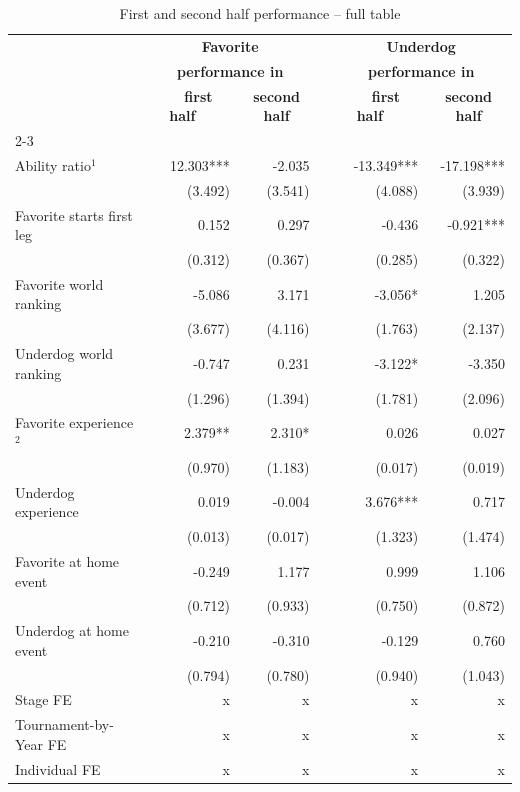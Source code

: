 \documentclass[11pt,a4paper]{article}
\begin{document}
	\begin{table}[H]
		\centering
		\caption{First and second half performance -- full table} 
		\label{tab:table_app_half}
		\begin{tabular}{l r r r r r} 
			\toprule \toprule
			& \multicolumn{2}{c}{\textbf{Favorite}} & &  \multicolumn{2}{c}{\textbf{Underdog}} \\
			& \multicolumn{2}{c}{\textbf{performance in }} & &  \multicolumn{2}{c}{\textbf{performance in }} \\
   			& \multicolumn{1}{c}{\textbf{~~first half~~}} & \multicolumn{1}{c}{\textbf{second half}} &  &  \multicolumn{1}{c}{\textbf{~~first half~~}} & \multicolumn{1}{c}{\textbf{second half}} \\
            \cline{2-3} \cline{5-6} \vspace{0.7em}\\ 
			Ability ratio$^1$          & 12.303*** & -2.035     & & -13.349*** &  -17.198*** \\
			                           & (3.492)   &  (3.541)   & &  (4.088)   &   (3.939)   \\
			Favorite starts first leg  &   0.152   &   0.297    & &  -0.436    &  -0.921***  \\
			                           &  (0.312)  &  (0.367)   & &  (0.285)   &   (0.322)   \\
			Favorite world ranking     & -5.086    &   3.171    & & -3.056*    &   1.205     \\
			                           &  (3.677)  &  (4.116)   & &  (1.763)   &   (2.137)   \\
			Underdog world ranking     &  -0.747   &   0.231    & & -3.122*    &   -3.350    \\
			                           &  (1.296)  &  (1.394)   & &  (1.781)   &   (2.096)   \\
			Favorite experience$^{2}$  &  2.379**  & 2.310*     & & 0.026      &   0.027     \\
			                           &   (0.970) &  (1.183)   & &  (0.017)   &   (0.019)   \\
			Underdog experience        &   0.019   &   -0.004   & &  3.676***  &   0.717    \\
			                           &  (0.013)  &  (0.017)   & &  (1.323)   &   (1.474)   \\
			Favorite at home event     &  -0.249   &  1.177     & &  0.999     &   1.106     \\
			                           &  (0.712)  &  (0.933)   & &  (0.750)   &   (0.872)   \\
			Underdog at home event     &  -0.210   &  -0.310    & & -0.129     &    0.760    \\
			                           &   (0.794) &  (0.780)   & &  (0.940)   &   (1.043)   \\
			\midrule
			Stage FE    &     x     &  x         & &  x         & x           \\ 
			Tournament-by-Year FE      &     x     &  x         & &  x         & x           \\ 
			Individual FE              &    x      &  x         & &  x         &  x         \\


\end{tabular}
\end{table}
\end{document}
